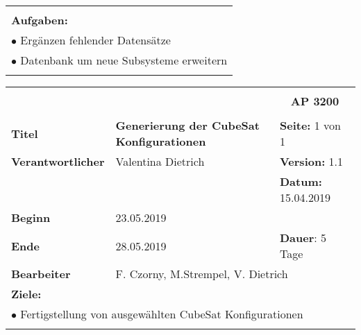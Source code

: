 \begin{table}[!h]
\begin{center}
\begin{tabular}{|p{35mm}||p{55mm}|p{50mm}||p{40mm}|}
   \multicolumn{4}{|p{150mm}|}{}\\
   \multicolumn{4}{|p{150mm}|}{\textbf{Aufgaben:}}\\
   \multicolumn{4}{|p{150mm}|}{$\bullet$ Ergänzen fehlender Datensätze}\\
	 \multicolumn{4}{|p{150mm}|}{$\bullet$ Datenbank um neue Subsysteme erweitern}\\
   \multicolumn{4}{|p{150mm}|}{}\\
   \hline
  \end{tabular}
 \end{center}
\end{table}

\clearpage
\begin{table}[!h]
 \begin{center}
  \begin{tabular}{|p{35mm}||p{55mm}|p{50mm}||p{40mm}|}
   \hline
   \multicolumn{3}{|l||}{\textbf{}} & \multicolumn{1}{c|}{}\\
   \multicolumn{3}{|l||}{\textbf{}} & \multicolumn{1}{c|}{\textbf{AP 3200}}\\
   \multicolumn{3}{|l||}{\textbf{}} & \multicolumn{1}{c|}{}\\
   \hline\hline
   \textbf{Titel} & \multicolumn{2}{p{7cm}||}{\textbf{Generierung der CubeSat Konfigurationen}} & \textbf{Seite:} 1 von 1\\
   \hline
   \textbf{Verantwortlicher} & \multicolumn{2}{l||}{Valentina Dietrich} & \textbf{Version:} 1.1\\
   \hline
   \multicolumn{3}{|l||}{} & \textbf{Datum:} 15.04.2019\\
   \hline\hline
   \textbf{Beginn} & \multicolumn{2}{l||}{23.05.2019} & \\
   \hline
   \textbf{Ende} & \multicolumn{2}{l||}{28.05.2019} & \textbf{Dauer}: 5 Tage\\
   \hline\hline
   \textbf{Bearbeiter} & \multicolumn{3}{l|}{F. Czorny, M.Strempel, V. Dietrich}\\
   \hline\hline
   \multicolumn{4}{|p{150mm}|}{\textbf{Ziele:}}\\
	 \multicolumn{4}{|p{150mm}|}{$\bullet$ Fertigstellung von ausgewählten CubeSat Konfigurationen}\\
   \multicolumn{4}{|p{150mm}|}{}\\

\end{tabular}
\end{center}
\end{table}
